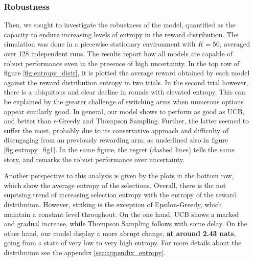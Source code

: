 \subsubsection{Robustness}

\noindent Then, we sought to investigate the robustness of the model, quantified as the capacity to endure increasing levels of entropy in the reward distribution.
The simulation was done in a piecewise stationary environment with $K=50$, averaged over 128 independent runs.
The results report how all models are capable of robust performance even in the presence of high uncertainty.
In the top row of figure \ref{fig:entropy_distr}, it is plotted the average reward obtained by each model against the reward distribution entropy in two trials.
In the second trial however, there is a ubiquitous and clear decline in rounds with elevated entropy. This can be explained by the greater challenge of switching arms when numerous options appear similarly good.
In general, our model shows to perform as good as UCB, and better than $\epsilon$-Greedy and Thompson Sampling.
Further, the latter seemed to suffer the most, probably due to its conservative approach and difficulty of disengaging from an previously rewarding arm, as underlined also in figure \ref{fig:entropy_fig1}.
In the same figure, the regret (dashed lines) tells the same story, and remarks the robust performance over uncertainty.

Another perspective to this analysis is given by the plots in the bottom row, which show the average entropy of the selections.
Overall, there is the not suprising trend of increasing selection entropy with the entropy of the reward distribution. However, striking is the exception of Epsilon-Greedy, which maintain a constant level throughout.
On the one hand, UCB shows a marked and gradual increase, while Thompson Sampling follows with some delay.
On the other hand, our model display a more abrupt change, \textbf{at around 2.43 nats}, going from a state of very low to very high entropy.
For more details about the distribution see the appendix \ref{sec:appendix_entropy}.


